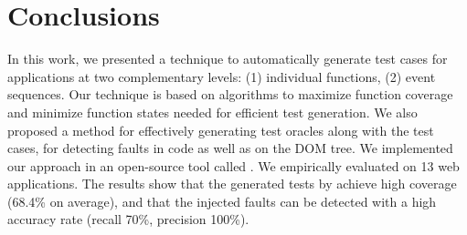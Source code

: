 \section{Conclusions} \label{Sec:concs}

In this work, we presented a technique  to automatically generate  test cases for \javascript applications at two complementary levels: (1) individual \javascript functions, (2) event sequences. 
Our technique is based on algorithms to maximize function coverage and minimize function states needed for efficient test generation.
We also proposed a method for effectively generating test oracles along with the test cases, for detecting faults in \javascript code as well as on the DOM tree. We implemented our  approach in an open-source tool called \jseft. We empirically evaluated \jseft on 13 web applications. The results show that the generated tests by \jseft achieve high coverage (68.4\% on average),  and that the injected faults can be detected with a high accuracy rate (recall 70\%, precision 100\%). 
%
 